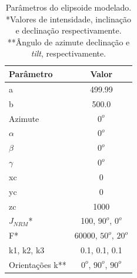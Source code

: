 \begin{table}[h]
	\begin{center}
		\begin{tabular}{|l|c|}
			\hline
			\textbf{Parâmetro}  & \textbf{Valor}  \\
			\hline 
			a   & 499.99 \\
			\hline
			b   & 500.0  \\
			\hline
			Azimute   & $0^o$ \\
			\hline
			$\alpha$    & $0^o$   \\
			\hline
			$\beta$    & $0^o$ \\
			\hline
			$\gamma$   & $0^o$  \\
			\hline
			xc   & 0  \\
			\hline          
			yc   & 0  \\
			\hline                
			zc   & 1000  \\
			\hline
			$J_{NRM}$*  & 100, $90^o$, $0^o$  \\
			\hline
			F*    & 60000, $50^o$, $20^o$ \\
			\hline
			k1, k2, k3   & 0.1, 0.1, 0.1  \\
			\hline
			Orientações k**   & $0^o$, $90^o$, $90^o$  \\
			\hline
		\end{tabular}
		\caption{Parâmetros do elipsoide modelado. *Valores de intensidade, inclinação e declinação respectivamente. **Ângulo de azimute
			declinação e \textit{tilt}, respectivamente.}
	\end{center}
	\label{tab:triaxial_oblate2}
\end{table}

